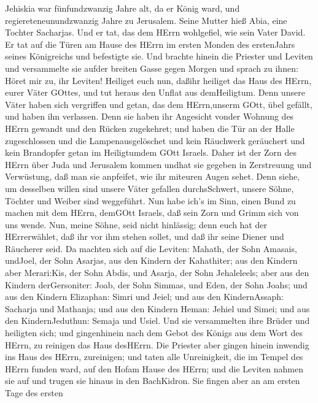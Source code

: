  Jehiskia war fünfundzwanzig Jahre alt, da er König ward,
und regiereteneunundzwanzig Jahre zu Jerusalem. Seine Mutter hieß Abia,
eine Tochter Sacharjas.  Und er tat, das dem HErrn
wohlgefiel, wie sein Vater David.  Er tat auf die Türen am
Hause des HErrn im ersten Monden des erstenJahrs seines Königreichs und
befestigte sie.  Und brachte hinein die Priester und Leviten
und versammelte sie aufder breiten Gasse gegen Morgen  und
sprach zu ihnen: Höret mir zu, ihr Leviten! Heiliget euch nun, daßihr
heiliget das Haus des HErrn, eurer Väter GOttes, und tut heraus den
Unflat aus demHeiligtum.  Denn unsere Väter haben sich
vergriffen und getan, das dem HErrn,unserm GOtt, übel gefällt, und haben
ihn verlassen. Denn sie haben ihr Angesicht vonder Wohnung des HErrn
gewandt und den Rücken zugekehret;  und haben die Tür an der
Halle zugeschlossen und die Lampenausgelöschet und kein Räuchwerk
geräuchert und kein Brandopfer getan im Heiligtumdem GOtt Israels.
 Daher ist der Zorn des HErrn über Juda und Jerusalem kommen
undhat sie gegeben in Zerstreuung und Verwüstung, daß man sie anpfeifet,
wie ihr miteuren Augen sehet.  Denn siehe, um desselben
willen sind unsere Väter gefallen durchsSchwert, unsere Söhne, Töchter
und Weiber sind weggeführt.  Nun habe ich's im Sinn, einen
Bund zu machen mit dem HErrn, demGOtt Israels, daß sein Zorn und Grimm
sich von uns wende.  Nun, meine Söhne, seid nicht
hinlässig; denn euch hat der HErrerwählet, daß ihr vor ihm stehen
sollet, und daß ihr seine Diener und Räucherer seid.  Da
machten sich auf die Leviten: Mahath, der Sohn Amasais, undJoel, der
Sohn Asarjas, aus den Kindern der Kahathiter; aus den Kindern aber
Merari:Kis, der Sohn Abdis, und Asarja, der Sohn Jehaleleels; aber aus
den Kindern derGersoniter: Joab, der Sohn Simmas, und Eden, der Sohn
Joahs;  und aus den Kindern Elizaphan: Simri und Jeiel; und
aus den KindernAssaph: Sacharja und Mathanja;  und aus den
Kindern Heman: Jehiel und Simei; und aus den KindernJeduthun: Semaja und
Usiel.  Und sie versammelten ihre Brüder und heiligten
sich; und gingenhinein nach dem Gebot des Königs aus dem Wort des HErrn,
zu reinigen das Haus desHErrn.  Die Priester aber gingen
hinein inwendig ins Haus des HErrn, zureinigen; und taten alle
Unreinigkeit, die im Tempel des HErrn funden ward, auf den Hofam Hause
des HErrn; und die Leviten nahmen sie auf und trugen sie hinaus in den
BachKidron.  Sie fingen aber an am ersten Tage des ersten
